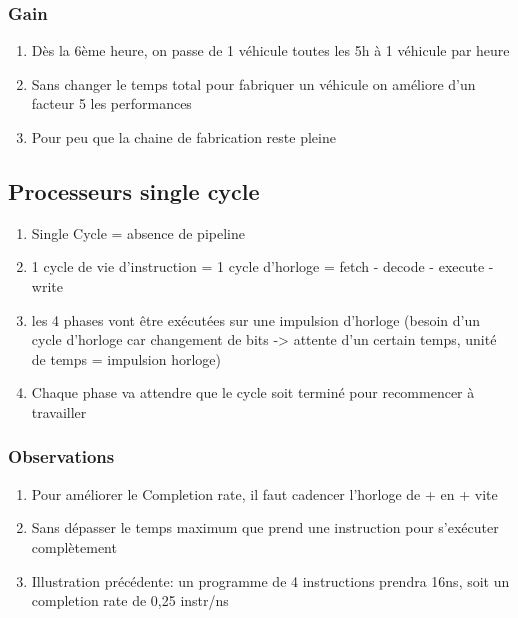 \subsubsection{Gain}
\begin{enumerate}
  \item Dès la 6ème heure, on passe de 1 véhicule toutes les 5h à 1 véhicule par heure
  \item Sans changer le temps total pour fabriquer un véhicule on améliore d'un facteur 5 les performances
  \item Pour peu que la chaine de fabrication reste pleine
\end{enumerate}

\subsection{Processeurs single cycle}
\begin{enumerate}
  \item Single Cycle = absence de pipeline
  \item 1 cycle de vie d'instruction = 1 cycle d'horloge = fetch - decode - execute - write
  \item les 4 phases vont être exécutées sur une impulsion d'horloge (besoin d'un cycle d'horloge car changement de bits -> attente d'un certain temps, unité de temps = impulsion horloge)
  \item Chaque phase va attendre que le cycle soit terminé pour recommencer à travailler
\end{enumerate}

\subsubsection{Observations}
\begin{enumerate}
  \item Pour améliorer le Completion rate, il faut cadencer l'horloge de + en + vite
  \item Sans dépasser le temps maximum que prend une instruction pour s'exécuter complètement
  \item Illustration précédente: un programme de 4 instructions prendra 16ns, soit un completion rate de 0,25 instr/ns
\end{enumerate}

